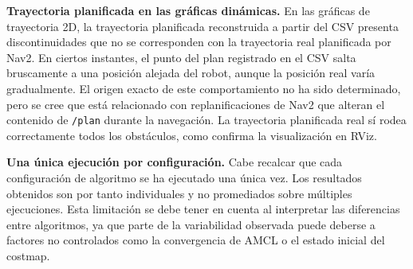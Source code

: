 \textbf{Trayectoria planificada en las gráficas dinámicas.} En las gráficas de trayectoria 2D, la trayectoria planificada reconstruida a partir del CSV presenta discontinuidades que no se corresponden con la trayectoria real planificada por Nav2. En ciertos instantes, el punto del plan registrado en el CSV salta bruscamente a una posición alejada del robot, aunque la posición real varía gradualmente. El origen exacto de este comportamiento no ha sido determinado, pero se cree que está relacionado con replanificaciones de Nav2 que alteran el contenido de \texttt{/plan} durante la navegación. La trayectoria planificada real sí rodea correctamente todos los obstáculos, como confirma la visualización en RViz.

\textbf{Una única ejecución por configuración.} Cabe recalcar que cada configuración de algoritmo se ha ejecutado una única vez. Los resultados obtenidos son por tanto individuales y no promediados sobre múltiples ejecuciones. Esta limitación se debe tener en cuenta al interpretar las diferencias entre algoritmos, ya que parte de la variabilidad observada puede deberse a factores no controlados como la convergencia de AMCL o el estado inicial del costmap.
